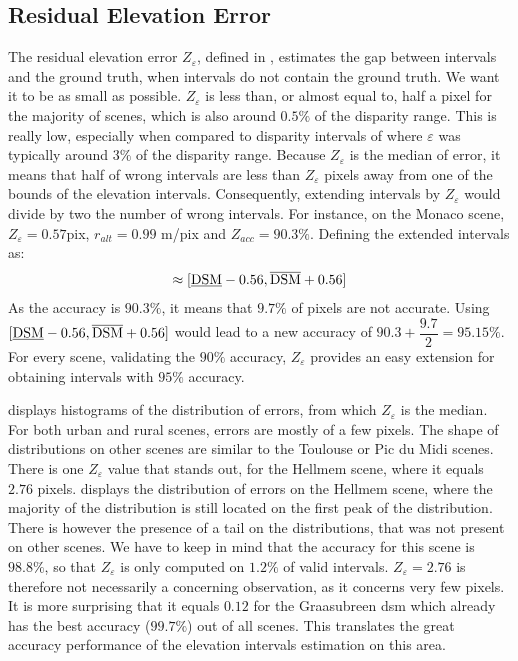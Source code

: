 \subsection{Residual Elevation Error}
The residual elevation error $Z_\varepsilon$, defined in , estimates the gap between intervals and the ground truth, when intervals do not contain the ground truth. We want it to be as small as possible. $Z_\varepsilon$ is less than, or almost equal to, half a pixel for the majority of scenes, which is also around $0.5\%$ of the disparity range. This is really low, especially when compared to disparity intervals of  where $\varepsilon$ was typically around $3\%$ of the disparity range. Because $Z_\varepsilon$ is the median of error, it means that half of wrong intervals are less than $Z_\varepsilon$ pixels away from one of the bounds of the elevation intervals. Consequently, extending intervals by $Z_\varepsilon$ would divide by two the number of wrong intervals. For instance, on the Monaco scene, $Z_\varepsilon=0.57$pix, $r_{alt}=0.99$ m/pix and $Z_{acc}=90.3\%$. Defining the extended intervals as:
\begin{align*}
    [\underline{\DSM}-Z_\varepsilon\cdot r_{alt}, \overline{\DSM}+Z_\varepsilon\cdot r_{alt}] \approx [\underline{\DSM}-0.56, \overline{\DSM}+0.56]
\end{align*}
As the accuracy is $90.3\%$, it means that $9.7\%$ of pixels are not accurate. Using $[\underline{\mathrm{DSM}}-0.56, \overline{\mathrm{DSM}}+0.56]$ would lead to a new accuracy of $90.3+\dfrac{9.7}{2}=95.15\%$. For every scene, validating the $90\%$ accuracy, $Z_\varepsilon$ provides an easy extension for obtaining intervals with $95\%$ accuracy.

 displays histograms of the distribution of errors, from which $Z_\varepsilon$ is the median. For both urban and rural scenes, errors are mostly of a few pixels. The shape of distributions on other scenes are similar to the Toulouse or Pic du Midi scenes. There is one $Z_\varepsilon$ value that stands out, for the Hellmem scene, where it equals $2.76$ pixels.  displays the distribution of errors on the Hellmem scene, where the majority of the distribution is still located on the first peak of the distribution. There is however the presence of a tail on the distributions, that was not present on other scenes. We have to keep in mind that the accuracy for this scene is $98.8\%$, so that $Z_\varepsilon$ is only computed on $1.2\%$ of valid intervals. $Z_\varepsilon=2.76$ is therefore not necessarily a concerning observation, as it concerns very few pixels. It is more surprising that it equals $0.12$ for the Graasubreen \acrshort{dsm} which already has the best accuracy ($99.7\%$) out of all scenes. This translates the great accuracy performance of the elevation intervals estimation on this area.

